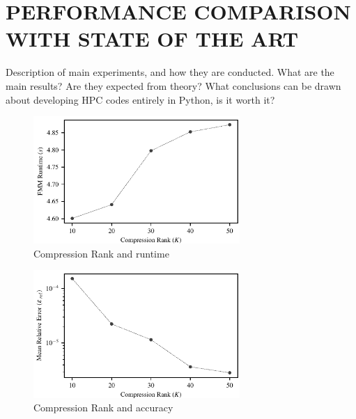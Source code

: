 \documentclass{IEEEcsmag}
\begin{document}
\section{PERFORMANCE COMPARISON WITH STATE OF THE ART}

Description of main experiments, and how they are conducted. What are the main results? Are they expected from theory? What conclusions can be drawn about developing HPC codes entirely in Python, is it worth it?

\begin{figure}
\centerline{\includegraphics[width=18.5pc]{figures/compression_runtime.pdf}}
\caption{Compression Rank and runtime}
\end{figure}

\begin{figure}
\centerline{\includegraphics[width=18.5pc]{figures/compression_accuracy.pdf}}
\caption{Compression Rank and accuracy}
\end{figure}
\end{document}
